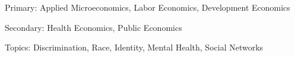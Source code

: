 \documentclass[10pt,letterpaper]{article}
\renewenvironment{itemize}{
  \begin{list}{}{
    \setlength{\leftmargin}{1.5em}
  }
}{
  \end{list}
}
\begin{document}
Primary: Applied Microeconomics, Labor Economics, Development Economics

Secondary: Health Economics, Public Economics 

Topics: Discrimination, Race, Identity, Mental Health, Social Networks

%
\end{document}
